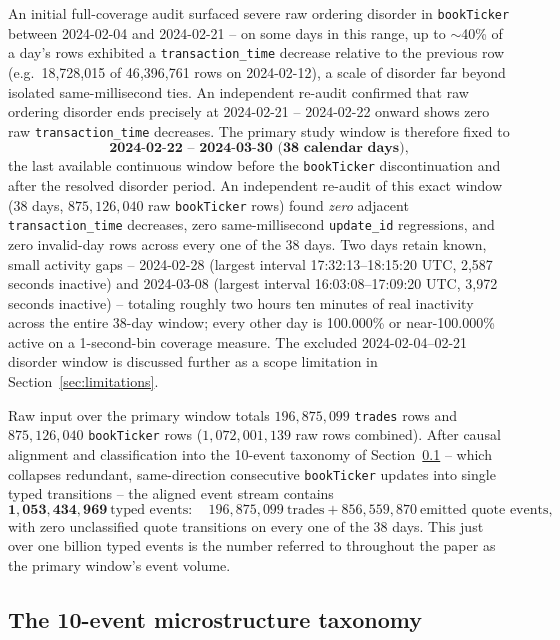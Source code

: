 An initial full-coverage audit surfaced severe raw ordering disorder in
\texttt{bookTicker} between 2024-02-04 and 2024-02-21 -- on some days in
this range, up to $\sim$40\% of a day's rows exhibited a
\texttt{transaction\_time} decrease relative to the previous row (e.g.\
18{,}728{,}015 of 46{,}396{,}761 rows on 2024-02-12), a scale of disorder
far beyond isolated same-millisecond ties. An independent re-audit
confirmed that raw ordering disorder ends precisely at 2024-02-21 --
2024-02-22 onward shows zero raw \texttt{transaction\_time} decreases.
The primary study window is therefore fixed to
\[
  \textbf{2024-02-22 -- 2024-03-30 (38 calendar days)},
\]
the last available continuous window before the \texttt{bookTicker}
discontinuation and after the resolved disorder period. An independent
re-audit of this exact window (38 days, $875{,}126{,}040$ raw
\texttt{bookTicker} rows) found \emph{zero} adjacent
\texttt{transaction\_time} decreases, zero same-millisecond
\texttt{update\_id} regressions, and zero invalid-day rows across every
one of the 38 days. Two days retain known, small activity gaps --
2024-02-28 (largest interval 17:32:13--18:15:20 UTC, 2{,}587 seconds
inactive) and 2024-03-08 (largest interval 16:03:08--17:09:20 UTC,
3{,}972 seconds inactive) -- totaling roughly two hours ten minutes of
real inactivity across the entire 38-day window; every other day is
100.000\% or near-100.000\% active on a 1-second-bin coverage measure.
The excluded 2024-02-04--02-21 disorder window is discussed further as a
scope limitation in Section~\ref{sec:limitations}.

Raw input over the primary window totals $196{,}875{,}099$
\texttt{trades} rows and $875{,}126{,}040$ \texttt{bookTicker} rows
($1{,}072{,}001{,}139$ raw rows combined). After causal alignment and
classification into the 10-event taxonomy of
Section~\ref{sec:data-taxonomy} -- which collapses redundant,
same-direction consecutive \texttt{bookTicker} updates into single typed
transitions -- the aligned event stream contains
\[
  \mathbf{1{,}053{,}434{,}969}\ \text{typed events}: \quad 196{,}875{,}099\ \text{trades} + 856{,}559{,}870\ \text{emitted quote events},
\]
with zero unclassified quote transitions on every one of the 38 days.
This just over one billion typed events is the number referred to
throughout the paper as the primary window's event volume.

\subsection{The 10-event microstructure taxonomy}
\label{sec:data-taxonomy}

